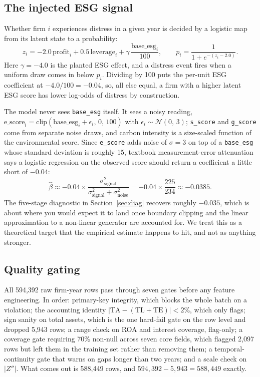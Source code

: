 \documentclass[conference]{IEEEtran}
\newcommand{\code}[1]{\texttt{\small #1}}
\begin{document}
\subsection{The injected ESG signal}
Whether firm $i$ experiences distress in a given year is decided by a logistic
map from its latent state to a probability:
\begin{equation}
z_i = -2.0\, \mathrm{profit}_i + 0.5\, \mathrm{leverage}_i
      + \gamma\, \frac{\mathrm{base\_esg}_i}{100},
\qquad
p_i = \frac{1}{1 + e^{-(z_i - 2.0)}}.
\end{equation}
Here $\gamma = -4.0$ is the planted ESG effect, and a distress event fires when a
uniform draw comes in below $p_i$. Dividing by 100 puts the per-unit ESG
coefficient at $-4.0/100 = -0.04$, so, all else equal, a firm with a higher
latent ESG score has lower log-odds of distress by construction.

The model never sees \code{base\_esg} itself. It sees a noisy reading,
$\mathrm{e\_score}_i = \mathrm{clip}(\mathrm{base\_esg}_i + \epsilon_i,\, 0,\,
100)$ with $\epsilon_i \sim \mathcal{N}(0,\, 3)$; \code{s\_score} and
\code{g\_score} come from separate noise draws, and carbon intensity is a
size-scaled function of the environmental score. Since \code{e\_score} adds
noise of $\sigma = 3$ on top of a \code{base\_esg} whose standard deviation is
roughly 15, textbook measurement-error attenuation says a logistic regression on
the observed score should return a coefficient a little short of $-0.04$:
\begin{equation}
\hat{\beta} \approx -0.04 \times
\frac{\sigma_{\text{signal}}^2}{\sigma_{\text{signal}}^2 + \sigma_{\text{noise}}^2}
= -0.04 \times \frac{225}{234} \approx -0.0385.
\label{eq:coefmap}
\end{equation}
The five-stage diagnostic in Section~\ref{sec:diag} recovers roughly $-0.035$,
which is about where you would expect it to land once boundary clipping and the
linear approximation to a non-linear generator are accounted for. We treat this
as a theoretical target that the empirical estimate happens to hit, and not as
anything stronger.

\subsection{Quality gating}
All 594{,}392 raw firm-year rows pass through seven gates before any feature
engineering. In order: primary-key integrity, which blocks the whole batch on a
violation; the accounting identity $|\mathrm{TA}-(\mathrm{TL}+\mathrm{TE})| < 2\%$,
which only flags; sign sanity on total assets, which is the one hard-fail gate on
the row level and dropped 5{,}943 rows; a range check on ROA and interest
coverage, flag-only; a coverage gate requiring 70\% non-null across seven core
fields, which flagged 2{,}097 rows but left them in the training set rather than
removing them; a temporal-continuity gate that warns on gaps longer than two
years; and a scale check on $|Z''|$. What comes out is 588{,}449 rows, and
$594{,}392 - 5{,}943 = 588{,}449$ exactly.
\end{document}
